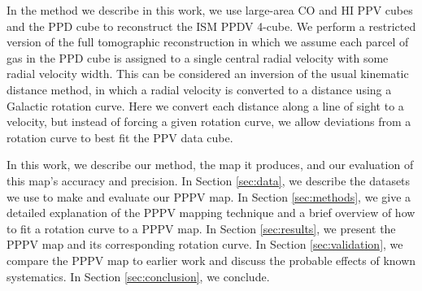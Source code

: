 In the method we describe in this work, we use large-area CO and HI PPV cubes and the \citet{Green_2015} PPD cube to reconstruct the ISM PPDV 4-cube. We perform a restricted version of the full tomographic reconstruction in which we assume each parcel of gas in the PPD cube is assigned to a single central radial velocity with some radial velocity width. This can be considered an inversion of the usual kinematic distance method, in which a radial velocity is converted to a distance using a Galactic rotation curve. Here we convert each distance along a line of sight to a velocity, but instead of forcing a given rotation curve, we allow deviations from a rotation curve to best fit the PPV data cube.

In this work, we describe our method, the map it produces, and our evaluation of this map's accuracy and precision.
In Section \ref{sec:data}, we describe the datasets we use to make and evaluate our PPPV map.
In Section \ref{sec:methods}, we give a detailed explanation of the PPPV mapping technique and a brief overview of how to fit a rotation curve to a PPPV map.
In Section \ref{sec:results}, we present the PPPV map and its corresponding rotation curve.
In Section \ref{sec:validation}, we compare the PPPV map to earlier work and discuss the probable effects of known systematics.
In Section \ref{sec:conclusion}, we conclude.
